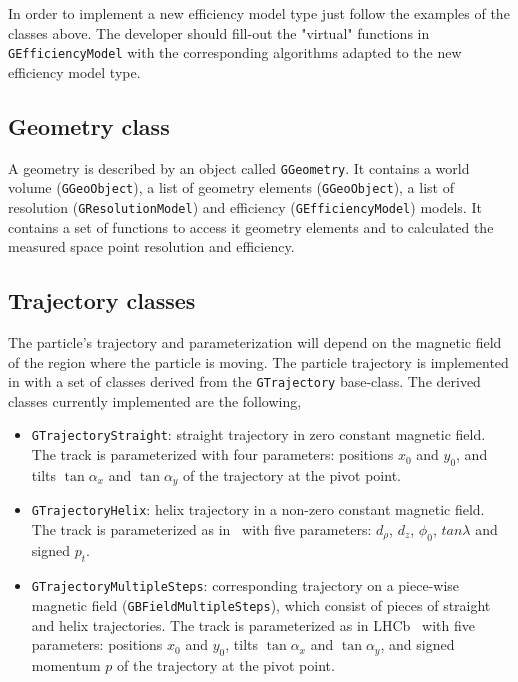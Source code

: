 In order to implement a new efficiency model type just follow the examples of the classes above. The developer should fill-out the "virtual" functions in {\tt GEfficiencyModel} with the 
corresponding algorithms adapted to the new efficiency model type.

\subsection{Geometry class}
\label{subsec:geometry_class}

A geometry is described by an object called {\tt GGeometry}. It contains a world volume ({\tt GGeoObject}), a list of geometry elements ({\tt GGeoObject}), a list of resolution ({\tt GResolutionModel}) 
and efficiency ({\tt GEfficiencyModel}) models. It contains a set of functions to access it geometry elements and to calculated the measured space point resolution and efficiency. 

\subsection{Trajectory classes}
\label{subsec:trajectory_class}

The particle's trajectory and parameterization will depend on the magnetic field of the region where the particle is moving. The particle trajectory is implemented in {\guari} with a set of 
classes derived from the {\tt GTrajectory} base-class. The derived classes currently implemented are the following,

\begin{itemize}
  \item  {\tt GTrajectoryStraight}: straight trajectory in zero constant magnetic field. The track is parameterized with four parameters: positions $x_0$ and $y_0$, and  tilts $\tan\alpha_x$ and $\tan\alpha_y$ 
  of the trajectory at the pivot point.
  
  \item  {\tt GTrajectoryHelix}: helix trajectory in a non-zero constant magnetic field. The track is parameterized as in~\cite{bib:BelleHelixParam} with five parameters: 
  $d_{\rho}$, $d_z$, $\phi_0$, $tan\lambda$ and signed $p_t$.
  
  \item  {\tt GTrajectoryMultipleSteps}: corresponding trajectory on a piece-wise magnetic field ({\tt GBFieldMultipleSteps}), which consist of pieces of straight and helix trajectories. 
  The track is parameterized as in LHCb~\cite{GGG} with five parameters: positions $x_0$ and $y_0$, tilts $\tan\alpha_x$ and $\tan\alpha_y$, and signed momentum $p$ of the trajectory at the pivot point. 
\end{itemize}

